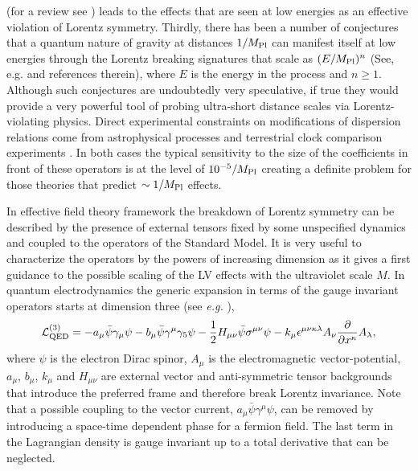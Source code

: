 \documentclass[12pt]{revtex4}
\begin{document}
(for a review see \cite{DN})
leads to the effects that are seen at low energies as an effective 
violation of Lorentz symmetry. Thirdly, there has been a number of 
conjectures that a quantum nature of gravity at distances $1/M_{\rm Pl}$ 
can manifest itself at low energies through the  Lorentz breaking signatures 
that scale as $(E/M_{\rm Pl})^n$ (See, e.g. \cite{lcq} and references therein), 
where $E$ is the energy in 
the process and $n \geq 1$. Although such conjectures are undoubtedly 
very speculative, if true they would provide a very powerful tool of probing 
ultra-short distance scales via Lorentz-violating physics.  Direct experimental constraints on 
modifications of dispersion relations come from astrophysical processes 
\cite{CFJ,AmC,Ted1,GK,Kost2,Sarkar} and terrestrial 
clock comparison experiments \cite{clock1,clock2,Vuc,MP:}. In both cases the 
typical sensitivity to the size of the coefficients in 
front of these operators is at the level of $10^{-5}/M_{\rm Pl}$ creating 
a definite problem for those theories that predict $\sim 1/M_{\rm Pl}$ effects.

In effective field theory framework the breakdown of Lorentz 
symmetry can be described by the presence of external tensors fixed 
by some unspecified dynamics and coupled to the operators of the
Standard Model. It is very useful to characterize the operators by the powers 
of increasing dimension as it gives a first guidance to the 
possible scaling of the LV effects with the ultraviolet scale $M$. 
In quantum electrodynamics the generic expansion
in terms of the gauge invariant operators starts at dimension three (see {\em e.g.}
\cite{Kost1}),
\begin{equation}
{\cal L}_{\rm QED}^{(3)} =
-a_\mu \bar \psi \gamma_\mu \psi
- b_\mu \bar \psi \gamma^\mu \gamma_5 \psi - \frac{1}{2}H_{\mu\nu}\bar
\psi \sigma^{\mu\nu} \psi - k_\mu \epsilon^{\mu\nu\kappa\lambda}
A_\nu \frac{\partial}{\partial x^\kappa} A_\lambda, 
\label{LVqed}
\end{equation}
where $\psi$ is the electron Dirac spinor, $A_\mu$ is the
electromagnetic vector-potential, $a_{\mu}$,
$b_\mu$, $k_\mu$ and $H_{\mu\nu}$ are external vector and
anti-symmetric tensor backgrounds that introduce the preferred
frame and therefore break Lorentz invariance. Note that a possible
coupling to the vector current, $a_\mu \bar \psi \gamma^\mu \psi$,
can be removed by introducing a space-time dependent phase for a
fermion field. The last term in the Lagrangian density is gauge
invariant up to a total derivative that can be neglected. 
\end{document}
